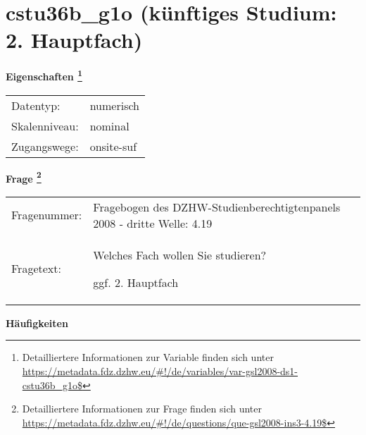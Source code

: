 
    \setcounter{footnote}{0}

    \vspace*{-1.8cm}
	\section{cstu36b\_g1o (künftiges Studium: 2. Hauptfach)}
	\label{section:cstu36b_g1o}



    \vspace*{0.5cm}
    \noindent\textbf{Eigenschaften
	\footnote{Detailliertere Informationen zur Variable finden sich unter
		\url{https://metadata.fdz.dzhw.eu/\#!/de/variables/var-gsl2008-ds1-cstu36b_g1o$}}}\\
	\begin{tabularx}{\hsize}{@{}lX}
	Datentyp: & numerisch \\
	Skalenniveau: & nominal \\
	Zugangswege: &
	  onsite-suf
 \\
    \end{tabularx}



				\vspace*{0.5cm}
                \noindent\textbf{Frage
	                \footnote{Detailliertere Informationen zur Frage finden sich unter
		              \url{https://metadata.fdz.dzhw.eu/\#!/de/questions/que-gsl2008-ins3-4.19$}}}\\
				\begin{tabularx}{\hsize}{@{}lX}
					Fragenummer: &
					  Fragebogen des DZHW-Studienberechtigtenpanels 2008 - dritte Welle:
					  4.19
 \\
					Fragetext: & Welches Fach wollen Sie studieren?\par  ggf. 2. Hauptfach \\
				\end{tabularx}





        		\vspace*{0.5cm}
                \noindent\textbf{Häufigkeiten}

